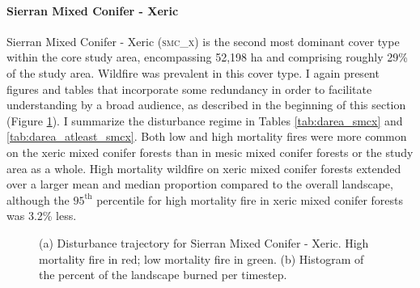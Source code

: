 

\paragraph*{Sierran Mixed Conifer - Xeric}
Sierran Mixed Conifer - Xeric (\textsc{smc\_x}) is the second most dominant cover type within the core study area, encompassing 52,198 ha and comprising roughly 29\% of the study area. Wildfire was prevalent in this cover type. I again present figures and tables that incorporate some redundancy in order to facilitate understanding by a broad audience, as described in the beginning of this section (Figure \ref{fig:darea_smcx}). I summarize the disturbance regime in Tables \ref{tab:darea_smcx} and \ref{tab:darea_atleast_smcx}. Both low and high mortality fires were more common on the xeric mixed conifer forests than in mesic mixed conifer forests or the study area as a whole. High mortality wildfire on xeric mixed conifer forests extended over a larger mean and median proportion compared to the overall landscape, although the $95^{\text{th}}$ percentile for high mortality fire in xeric mixed conifer forests was 3.2\% less.

\begin{figure}[!hbp]
  \centering
  \caption{\small (a) Disturbance trajectory for Sierran Mixed Conifer - Xeric. High mortality fire in red; low mortality fire in green. (b) Histogram of the percent of the landscape burned per timestep.} 
  \label{fig:darea_smcx}
\end{figure}

